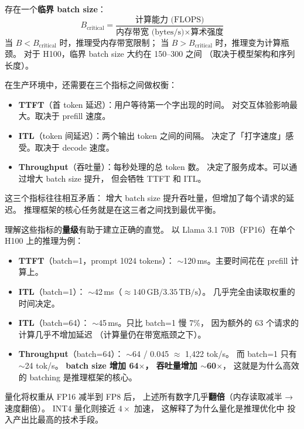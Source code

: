 存在一个\textbf{临界 batch size}：
\begin{equation}
  B_{\text{critical}} = \frac{\text{计算能力 (FLOPS)}}{\text{内存带宽 (bytes/s)} \times \text{算术强度}}
\end{equation}
当 $B < B_{\text{critical}}$ 时，推理受内存带宽限制；
当 $B > B_{\text{critical}}$ 时，推理变为计算瓶颈。
对于 H100，临界 batch size 大约在 150--300 之间
（取决于模型架构和序列长度）。

在生产环境中，还需要在三个指标之间做权衡：
\begin{itemize}[noitemsep]
  \item \textbf{TTFT}（首 token 延迟）：用户等待第一个字出现的时间。
        对交互体验影响最大。取决于 prefill 速度。
  \item \textbf{ITL}（token 间延迟）：两个输出 token 之间的间隔。
        决定了「打字速度」感受。取决于 decode 速度。
  \item \textbf{Throughput}（吞吐量）：每秒处理的总 token 数。
        决定了服务成本。可以通过增大 batch size 提升，
        但会牺牲 TTFT 和 ITL。
\end{itemize}

这三个指标往往相互矛盾：
增大 batch size 提升吞吐量，但增加了每个请求的延迟。
推理框架的核心任务就是在这三者之间找到最优平衡。

理解这些指标的\textbf{量级}有助于建立正确的直觉。
以 Llama 3.1 70B（FP16）在单个 H100 上的推理为例：
\begin{itemize}[noitemsep]
  \item \textbf{TTFT}（batch=1，prompt 1024 tokens）：
        $\sim$120\,ms。主要时间花在 prefill 计算上。
  \item \textbf{ITL}（batch=1）：
        $\sim$42\,ms（$\approx 140\,\text{GB} / 3.35\,\text{TB/s}$）。
        几乎完全由读取权重的时间决定。
  \item \textbf{ITL}（batch=64）：
        $\sim$45\,ms。只比 batch=1 慢 7\%，
        因为额外的 63 个请求的计算几乎不增加延迟
        （计算量仍在带宽瓶颈之下）。
  \item \textbf{Throughput}（batch=64）：
        $\sim$64 / 0.045 $\approx$ 1,422 tok/s。
        而 batch=1 只有 $\sim$24 tok/s。
        \textbf{batch size 增加 64$\times$，
        吞吐量增加 $\sim$60$\times$}，
        这就是为什么高效的 batching 是推理框架的核心。
\end{itemize}

量化将权重从 FP16 减半到 FP8 后，
上述所有数字几乎\textbf{翻倍}（内存读取减半 → 速度翻倍）。
INT4 量化则接近 $4\times$ 加速，
这解释了为什么量化是推理优化中
投入产出比最高的技术手段。

